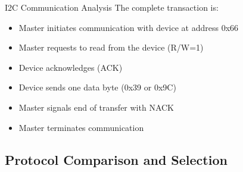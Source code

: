 \begin{example2}{I2C Communication Analysis}
The complete transaction is:
\begin{itemize}
    \item Master initiates communication with device at address 0x66
    \item Master requests to read from the device (R/W=1)
    \item Device acknowledges (ACK)
    \item Device sends one data byte (0x39 or 0x9C)
    \item Master signals end of transfer with NACK
    \item Master terminates communication
\end{itemize}
\end{example2}

\subsection{Protocol Comparison and Selection}


